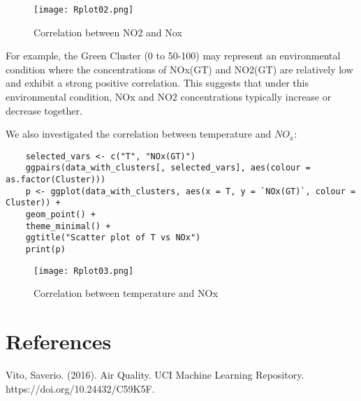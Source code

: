 \documentclass{article}
\begin{document}
\begin{figure}[H]
    \centering
    \texttt{[image: Rplot02.png]}
    \label{fig:unique_label_1}
    \caption{Correlation between NO2 and Nox}
    \end{figure}
    For example, the Green Cluster (0 to 50-100) may represent an environmental condition where the concentrations of NOx(GT) and NO2(GT) are relatively low and exhibit a strong positive correlation. This suggests that under this environmental condition, NOx and NO2 concentrations typically increase or decrease together.\par
    We also investigated the correlation between temperature and $NO_x$:
    \begin{verbatim}
    selected_vars <- c("T", "NOx(GT)")
    ggpairs(data_with_clusters[, selected_vars], aes(colour = as.factor(Cluster)))
    p <- ggplot(data_with_clusters, aes(x = T, y = `NOx(GT)`, colour = Cluster)) +
    geom_point() +
    theme_minimal() +
    ggtitle("Scatter plot of T vs NOx")
    print(p)

    \end{verbatim}
    \begin{figure}[H]
    \centering
    \texttt{[image: Rplot03.png]}
    \label{fig:unique_label_1}
    \caption{Correlation between temperature and NOx}
    \end{figure}

\section{References}

Vito, Saverio. (2016). Air Quality. UCI Machine Learning Repository.
https://doi.org/10.24432/C59K5F.
\end{document}
